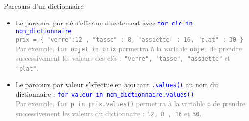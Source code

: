 \begin{frame}
\mframe{\PD}
\begin{alertblock}{Parcours d'un dictionnaire}
\begin{itemize}
\item<1-> Le parcours par clé s'effectue directement avec \textcolor{blue}{\tt for cle in nom\_dictionnaire}\\
\textcolor{gray}{{\tt prix = \{ "verre":12 , "tasse" : 8, "assiette" : 16, "plat" : 30 \} } \\
Par exemple, {\tt for objet in prix} permettra à la variable {\tt objet} de prendre successivement les valeurs des clés : {\tt "verre", "tasse", "assiette"} et {\tt "plat"}.}
\item<3-> Le parcours par valeur s'effectue en ajoutant \textcolor{blue}{\tt .values()} au nom du dictionnaire : \textcolor{blue}{\tt for valeur in nom\_dictionnaire.values() \\} 
\textcolor{gray}{
Par exemple, {\tt for p in prix.values()} permettra à la variable {\tt p} de prendre successivement les valeurs du dictionnaire : {\tt 12, 8 , 16} et {\tt 30}.
}
\end{itemize}
\end{alertblock}
\end{frame}



